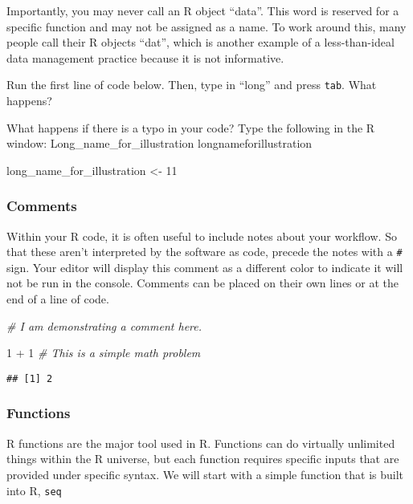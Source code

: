 \documentclass[
]{article}
\newenvironment{Shaded}{\begin{snugshade}}{\end{snugshade}}
\newcommand{\CommentTok}[1]{\textcolor[rgb]{0.56,0.35,0.01}{\textit{#1}}}
\newcommand{\DecValTok}[1]{\textcolor[rgb]{0.00,0.00,0.81}{#1}}
\newcommand{\NormalTok}[1]{#1}
\newcommand{\OtherTok}[1]{\textcolor[rgb]{0.56,0.35,0.01}{#1}}
\newcommand{\SpecialCharTok}[1]{\textcolor[rgb]{0.00,0.00,0.00}{#1}}
\begin{document}
Importantly, you may never call an R object ``data''. This word is
reserved for a specific function and may not be assigned as a name. To
work around this, many people call their R objects ``dat'', which is
another example of a less-than-ideal data management practice because it
is not informative.

Run the first line of code below. Then, type in ``long'' and press
\texttt{tab}. What happens?

What happens if there is a typo in your code? Type the following in the
R window: Long\_name\_for\_illustration longnameforillustration

\begin{Shaded}
\begin{Highlighting}[]
\NormalTok{long\_name\_for\_illustration }\OtherTok{\textless{}{-}} \DecValTok{11}
\end{Highlighting}
\end{Shaded}

\hypertarget{comments}{%
\subsubsection{Comments}\label{comments}}

Within your R code, it is often useful to include notes about your
workflow. So that these aren't interpreted by the software as code,
precede the notes with a \texttt{\#} sign. Your editor will display this
comment as a different color to indicate it will not be run in the
console. Comments can be placed on their own lines or at the end of a
line of code.

\begin{Shaded}
\begin{Highlighting}[]
\CommentTok{\# I am demonstrating a comment here. }

\DecValTok{1} \SpecialCharTok{+} \DecValTok{1} \CommentTok{\# This is a simple math problem}
\end{Highlighting}
\end{Shaded}

\begin{verbatim}
## [1] 2
\end{verbatim}

\hypertarget{functions}{%
\subsubsection{Functions}\label{functions}}

R functions are the major tool used in R. Functions can do virtually
unlimited things within the R universe, but each function requires
specific inputs that are provided under specific syntax. We will start
with a simple function that is built into R, \texttt{seq}
\end{document}
